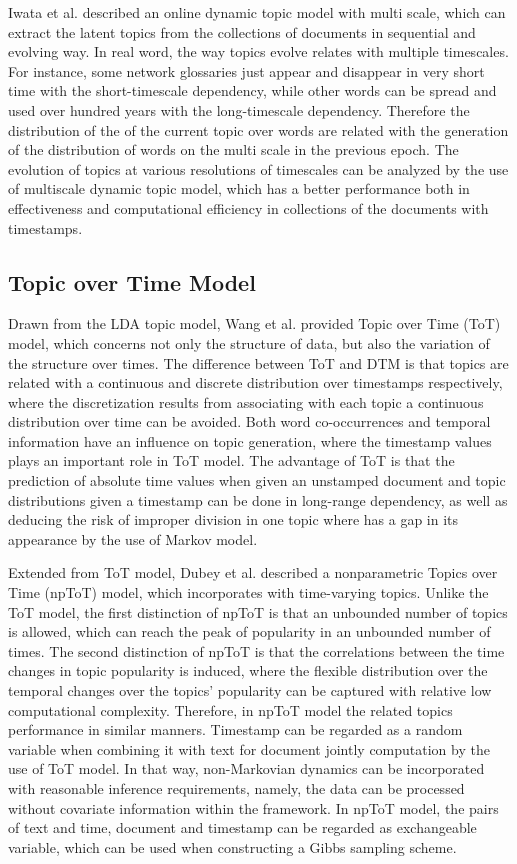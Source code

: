 Iwata et al. \cite{iwata2010online} described an online dynamic topic model with multi scale, which can extract the latent topics from the collections of documents in sequential and evolving way. In real word, the way topics evolve relates with multiple timescales. For instance, some network glossaries just appear and disappear in very short time with the short-timescale dependency, while other words can be spread and used over hundred years with the long-timescale dependency. Therefore the distribution of the of the current topic over words are related with the generation of the distribution of words on the multi scale in the previous epoch. The evolution of topics at various resolutions of timescales can be analyzed by the use of multiscale dynamic topic model, which has a better performance both in effectiveness and computational efficiency in collections of the documents with timestamps.

\subsection{Topic over Time Model}\label{2tot}
Drawn from the LDA topic model, Wang et al. \cite{wang2006topics} provided Topic over Time (ToT) model, which concerns not only the structure of data, but also the variation of the structure over times. The difference between ToT and DTM is that topics are related with a continuous and discrete distribution over timestamps respectively, where the discretization results from associating with each topic a continuous distribution over time can be avoided. Both word co-occurrences and temporal information have an influence on topic generation, where the timestamp values plays an important role in ToT model. The advantage of ToT is that the prediction of absolute time values when given an unstamped document and topic distributions given a timestamp can be done in long-range dependency, as well as deducing the risk of improper division in one topic where has a gap in its appearance by the use of Markov model.

Extended from ToT model, Dubey et al. \cite{dubey2013nonparametric} described a nonparametric Topics over Time (npToT) model, which incorporates with time-varying topics. Unlike the ToT model, the first distinction of npToT is that an unbounded number of topics is allowed, which can reach the peak of popularity in an unbounded number of times. The second distinction of npToT is that the correlations between the time changes in topic popularity is induced, where the flexible distribution over the temporal changes over the topics’ popularity can be captured with relative low computational complexity. Therefore, in npToT model the related topics performance in similar manners. Timestamp can be regarded as a random variable when combining it with text for document jointly computation by the use of ToT model. In that way, non-Markovian dynamics can be incorporated with reasonable inference requirements, namely, the data can be processed without covariate information within the framework. In npToT model, the pairs of text and time, document and timestamp can be regarded as exchangeable variable, which can be used when constructing a Gibbs sampling scheme.

